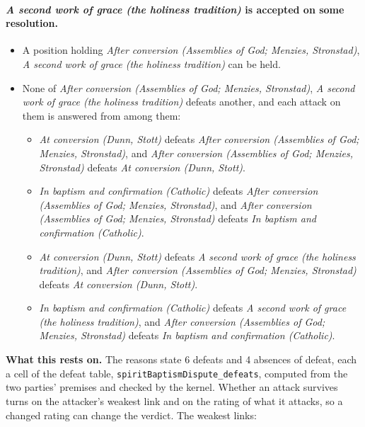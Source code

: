 \documentclass[11pt]{article}
\begin{document}
\paragraph{\emph{A second work of grace (the holiness tradition)} is accepted on some resolution.}
\begin{itemize}
\item A position holding \emph{After conversion (Assemblies of God; Menzies, Stronstad)}, \emph{A second work of grace (the holiness tradition)} can be held.
\item None of \emph{After conversion (Assemblies of God; Menzies, Stronstad)}, \emph{A second work of grace (the holiness tradition)} defeats another, and each attack on them is answered from among them:
\begin{itemize}
\item \emph{At conversion (Dunn, Stott)} defeats \emph{After conversion (Assemblies of God; Menzies, Stronstad)}, and \emph{After conversion (Assemblies of God; Menzies, Stronstad)} defeats \emph{At conversion (Dunn, Stott)}.
\item \emph{In baptism and confirmation (Catholic)} defeats \emph{After conversion (Assemblies of God; Menzies, Stronstad)}, and \emph{After conversion (Assemblies of God; Menzies, Stronstad)} defeats \emph{In baptism and confirmation (Catholic)}.
\item \emph{At conversion (Dunn, Stott)} defeats \emph{A second work of grace (the holiness tradition)}, and \emph{After conversion (Assemblies of God; Menzies, Stronstad)} defeats \emph{At conversion (Dunn, Stott)}.
\item \emph{In baptism and confirmation (Catholic)} defeats \emph{A second work of grace (the holiness tradition)}, and \emph{After conversion (Assemblies of God; Menzies, Stronstad)} defeats \emph{In baptism and confirmation (Catholic)}.
\end{itemize}
\end{itemize}
\par\noindent\textbf{What this rests on.} The reasons state 6 defeats and 4 absences of defeat, each a cell of the defeat table, \texttt{spirit\allowbreak{}Baptism\allowbreak{}Dispute\_\allowbreak{}defeats}, computed from the two parties' premises and checked by the kernel. Whether an attack survives turns on the attacker's weakest link and on the rating of what it attacks, so a changed rating can change the verdict. The weakest links:
\end{document}

